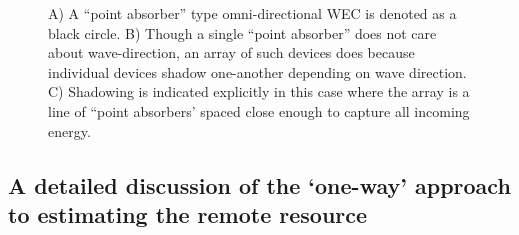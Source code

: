 \begin{figure}[ht]
    \centering
    \caption{A) A ``point absorber'' type omni-directional WEC is denoted as a black circle. B) Though a single ``point absorber'' does not care about wave-direction, an array of such devices does because individual devices shadow one-another depending on wave direction. C) Shadowing is indicated explicitly in this case where the array is a line of ``point absorbers' spaced close enough to capture all incoming energy.}
    \label{fig:omni-dir}
\end{figure}

\subsection{A detailed discussion of the `one-way' approach to estimating the remote resource}

